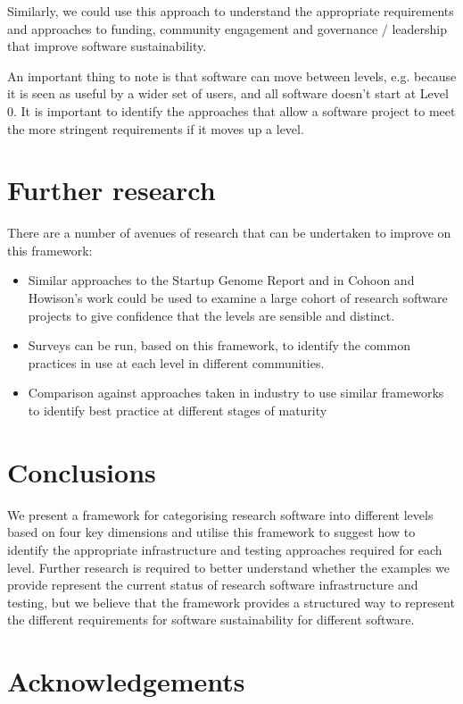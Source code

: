 \documentclass[conference]{IEEEtran}
\begin{document}
Similarly, we could use this approach to understand the appropriate requirements and approaches to funding, community engagement and governance / leadership that improve software sustainability. 

An important thing to note is that software can move between levels, e.g. because it is seen as useful by a wider set of users, and all software doesn’t start at Level 0. It is important to identify the approaches that allow a software project to meet the more stringent requirements if it moves up a level.


\section{Further research}

There are a number of avenues of research that can be undertaken to improve on this framework: 
\begin{itemize}
    \item Similar approaches to the Startup Genome Report \cite{Marmer} and in Cohoon and Howison's work \cite{Cohoon} could be used to examine a large cohort of research software projects to give confidence that the levels are sensible and distinct.
    \item Surveys can be run, based on this framework, to identify the common practices in use at each level in different communities.
    \item Comparison against approaches taken in industry to use similar frameworks to identify best practice at different stages of maturity
\end{itemize}

\section{Conclusions}

We present a framework for categorising research software into different levels based on four key dimensions and utilise this framework to suggest how to identify the appropriate infrastructure and testing approaches required for each level. Further research is required to better understand whether the examples we provide represent the current status of research software infrastructure and testing, but we believe that the framework provides a structured way to represent the different requirements for software sustainability for different software.

\newpage

\section*{Acknowledgements}
\end{document}

